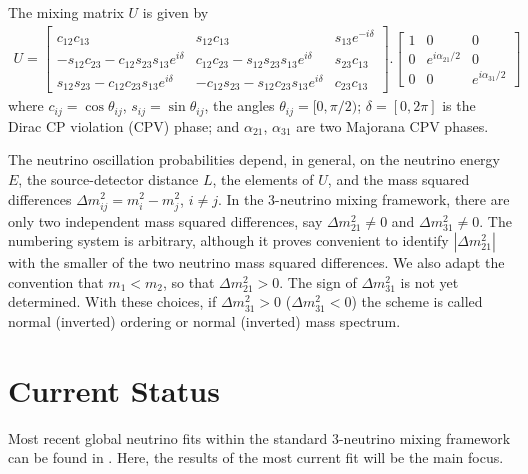 \documentclass[english]{article}
\begin{document}
    The mixing matrix $U$ is given by
    \begin{gather}
    	U =
        	\begin{bmatrix}
            	c_{12}c_{13} & s_{12}c_{13} & s_{13}e^{-i\delta}\\
                -s_{12}c_{23}-c_{12}s_{23}s_{13}e^{i\delta} & c_{12}c_{23}-s_{12}s_{23}s_{13}e^{i\delta} & s_{23}c_{13}\\
                s_{12}s_{23}-c_{12}c_{23}s_{13}e^{i\delta} & -c_{12}s_{23}-s_{12}c_{23}s_{13}e^{i\delta} & c_{23}c_{13}
            \end{bmatrix} .
            \begin{bmatrix}
            	1 & 0 & 0\\
                0 & e^{i\alpha_{21}/2} & 0\\
                0 & 0 & e^{i\alpha_{31}/2}
            \end{bmatrix}
    \end{gather}
    where $c_{ij}=\cos\theta_{ij}$, $s_{ij}=\sin\theta_{ij}$, the angles $\theta_{ij}=[0,\pi/2)$; $\delta=[0,2\pi]$ is the Dirac CP violation (CPV) phase; and $\alpha_{21}$, $\alpha_{31}$ are two Majorana CPV phases.
    
    The neutrino oscillation probabilities depend, in general, on the neutrino
energy $E$, the source-detector distance $L$, the elements of $U$, and the mass squared differences $\Delta{m_{ij}^{2}}=m_i^{2}-m_j^{2}$, $i \neq j$. In the 3-neutrino mixing framework, there are only two independent mass squared differences, say $\Delta{m_{21}^{2}} \neq 0$ and $\Delta{m_{31}^{2}} \neq 0$. The numbering system is arbitrary, although it proves convenient to identify $|\Delta{m_{21}^{2}}|$ with the smaller of the two neutrino mass squared differences. We also adapt the convention that $m_{1}<m_{2}$, so that $\Delta{m_{21}^{2}}>0$. The sign of $\Delta{m_{31}^{2}}$ is not yet determined. With these choices, if $\Delta{m_{31}^{2}}>0$ ($\Delta{m_{31}^{2}}<0$) the scheme is called normal (inverted) ordering or normal (inverted) mass spectrum.

\section{Current Status}
	Most recent global neutrino fits within the standard 3-neutrino mixing framework can be found in \cite{esteban2017} \cite{capozzi2017} \cite{salas2018}. Here, the results of the most current fit \cite{salas2018} will be the main focus.
    
\end{document}
